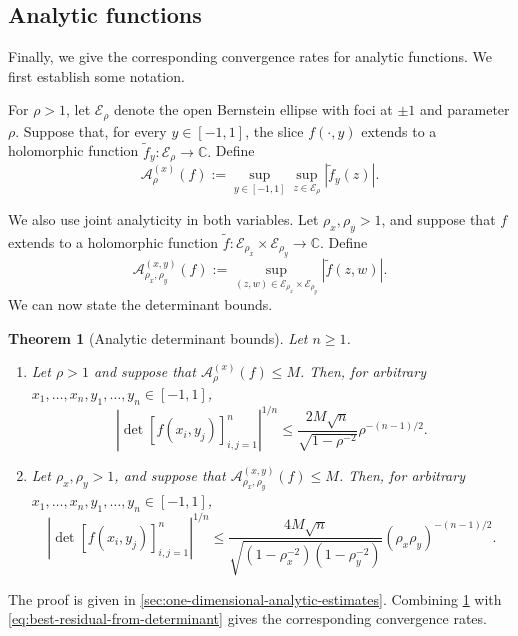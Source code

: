 \documentclass[11pt]{article}
\newtheorem{theorem}{Theorem}[section]
\theoremstyle{definition}
\theoremstyle{remark}
\newcommand{\C}{\mathbb{C}}
\newcommand{\cE}{\mathcal{E}}
\newcommand{\abs}[1]{\left\lvert #1\right\rvert}
\begin{document}
\subsection{Analytic functions}
\label{subsec:one-dimensional-analytic}

Finally, we give the corresponding convergence rates for analytic
functions. We first establish some notation.

For $\rho>1$, let $\cE_\rho$
denote the open Bernstein ellipse with foci at $\pm1$ and parameter
$\rho$.
Suppose that, for every $y\in[-1,1]$, the slice $f(\cdot,y)$ extends
to a holomorphic function
$
    \widetilde f_y:\cE_\rho\to\C.
$
Define
\[
    \mathcal A_\rho^{(x)}(f)
    :=
    \sup_{y\in[-1,1]}
    \sup_{z\in\cE_\rho}
    \abs{\widetilde f_y(z)}.
\]

We also use joint analyticity in both variables. Let
$\rho_x,\rho_y>1$, and suppose that $f$ extends to a holomorphic function
$
    \widetilde f:
    \cE_{\rho_x}\times\cE_{\rho_y}\to\C.
$
Define
\[
    \mathcal A_{\rho_x,\rho_y}^{(x,y)}(f)
    :=
    \sup_{(z,w)\in\cE_{\rho_x}\times\cE_{\rho_y}}
    \abs{\widetilde f(z,w)}.
\]
We can now state the determinant bounds.
\begin{theorem}[Analytic determinant bounds]
\label{thm:analytic-determinant}
Let $n\ge1$.
\begin{enumerate}

\item
Let $\rho>1$ and suppose that
$\mathcal A_\rho^{(x)}(f)\le M$. Then, for arbitrary
$x_1,\ldots,x_n,y_1,\ldots,y_n\in [-1, 1]$,
\begin{equation}
    \abs{\det[f(x_i,y_j)]_{i,j=1}^n}^{1/n}
    \le
    \frac{2M\sqrt n}{\sqrt{1-\rho^{-2}}}
    \rho^{-(n-1)/2}.
    \label{eq:analytic-determinant}
\end{equation}

\item
Let $\rho_x,\rho_y>1$, and suppose that
$\mathcal A_{\rho_x,\rho_y}^{(x,y)}(f)\le M$. Then, for arbitrary
$x_1,\ldots,x_n,y_1,\ldots,y_n\in [-1, 1]$,
\begin{equation}
    \abs{\det[f(x_i,y_j)]_{i,j=1}^n}^{1/n}
    \le
    \frac{4M\sqrt n}
         {\sqrt{(1-\rho_x^{-2})(1-\rho_y^{-2})}}
    (\rho_x\rho_y)^{-(n-1)/2}.
    \label{eq:mixed-analytic-determinant}
\end{equation}

\end{enumerate}
\end{theorem}
The proof is given in
\cref{sec:one-dimensional-analytic-estimates}.
Combining \cref{thm:analytic-determinant} with
\eqref{eq:best-residual-from-determinant} gives the corresponding
convergence rates.
\end{document}
